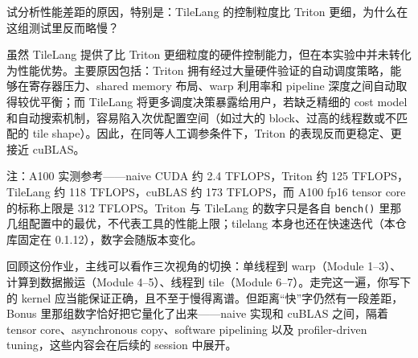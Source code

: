 \documentclass[11pt,a4paper,fontset=none]{ctexart}
\begin{document}
试分析性能差距的原因，特别是：TileLang 的控制粒度比 Triton 更细，为什么在这组测试里反而略慢？

虽然 TileLang 提供了比 Triton 更细粒度的硬件控制能力，但在本实验中并未转化为性能优势。主要原因包括：Triton 拥有经过大量硬件验证的自动调度策略，能够在寄存器压力、shared memory 布局、warp 利用率和 pipeline 深度之间自动取得较优平衡；而 TileLang 将更多调度决策暴露给用户，若缺乏精细的 cost model 和自动搜索机制，容易陷入次优配置空间（如过大的 block、过高的线程数或不匹配的 tile shape）。因此，在同等人工调参条件下，Triton 的表现反而更稳定、更接近 cuBLAS。

注：A100 实测参考——naive CUDA 约 2.4 TFLOPS，Triton 约 125 TFLOPS，TileLang 约 118 TFLOPS，cuBLAS 约 173 TFLOPS，而 A100 fp16 tensor core 的标称上限是 312 TFLOPS。Triton 与 TileLang 的数字只是各自 \texttt{bench()} 里那几组配置中的最优，不代表工具的性能上限；tilelang 本身也还在快速迭代（本仓库固定在 0.1.12），数字会随版本变化。
\begin{lookback}
回顾这份作业，主线可以看作三次视角的切换：单线程到 warp（Module 1--3）、计算到数据搬运（Module 4--5）、线程到 tile（Module 6--7）。走完这一遍，你写下的 kernel 应当能保证正确，且不至于慢得离谱。但距离“快”字仍然有一段差距，Bonus 里那组数字恰好把它量化了出来——naive 实现和 cuBLAS 之间，隔着 tensor core、asynchronous copy、software pipelining 以及 profiler-driven tuning，这些内容会在后续的 session 中展开。
\end{lookback}
\end{document}
